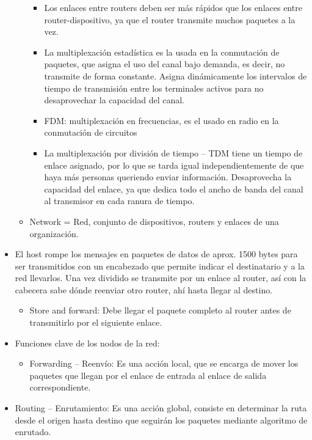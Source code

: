 \documentclass[12pt, twoside, openright]{report} %
\begin{document}
\begin{itemize}
\begin{itemize}
		            \begin{itemize}
			            \item Los enlaces entre routers deben ser más rápidos que los enlaces
			                  entre router-dispositivo, ya que el router transmite muchos
			                  paquetes a la vez.
			            \item La multiplexación estadística es la usada en la conmutación de
			                  paquetes, que asigna el uso del canal bajo demanda, es decir, no
			                  transmite de forma constante. Asigna dinámicamente los
			                  intervalos de tiempo de transmisión entre los terminales activos
			                  para no desaprovechar la capacidad del canal.
			            \item FDM: multiplexación en frecuencias, es el usado en radio en la
			                  conmutación de circuitos
			            \item La multiplexación por división de tiempo -- TDM tiene un tiempo
			                  de enlace asignado, por lo que se tarda igual independientemente
			                  de que haya más personas queriendo enviar información.
			                  Desaprovecha la capacidad del enlace, ya que dedica todo el
			                  ancho de banda del canal al transmisor en cada ranura de tiempo.
		            \end{itemize}
		      \item Network = Red, conjunto de dispositivos, routers y enlaces de una
		            organización.
	      \end{itemize}
	      \pagebreak
	\item El host rompe los mensajes en paquetes de datos de aprox. 1500 bytes
	      para ser transmitidos con un encabezado que permite indicar el
	      destinatario y a la red llevarlos. Una vez dividido se transmite por
	      un enlace al router, así con la cabecera sabe dónde reenviar otro
	      router, ahí hasta llegar al destino.

	      \begin{itemize}
		      \item Store and forward: Debe llegar el paquete completo al router antes
		            de transmitirlo por el siguiente enlace.
	      \end{itemize}
	\item Funciones clave de los nodos de la red:

	      \begin{itemize}
		      \item Forwarding -- Reenvío: Es una acción local, que se encarga de
		            mover los paquetes que llegan por el enlace de entrada al enlace
		            de salida correspondiente.
	      \end{itemize}
	\item Routing -- Enrutamiento: Es una acción global, consiste en
	      determinar la ruta desde el origen hasta destino que seguirán los
	      paquetes mediante algoritmo de enrutado.
\end{itemize}
\end{document}

